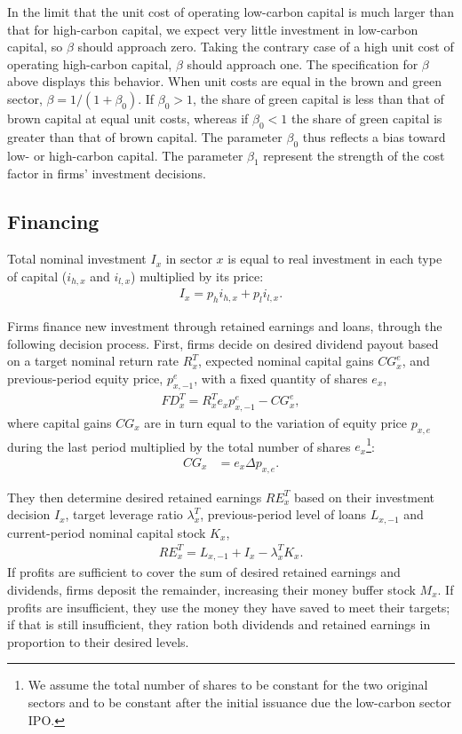 \documentclass[authoryear]{article}
\begin{document}
In the limit that the unit cost of operating low-carbon capital is much larger than that for high-carbon capital, we expect very little investment in low-carbon capital, so $\beta$ should approach zero. Taking the contrary case of a high unit cost of operating high-carbon capital, $\beta$ should approach one. The specification for $\beta$ above displays this behavior. When unit costs are equal in the brown and green sector, $\beta = 1/(1 + \beta_0)$. If $\beta_0 > 1$, the share of green capital is less than that of brown capital at equal unit costs, whereas if $\beta_0 < 1$ the share of green capital is greater than that of brown capital. The parameter $\beta_0$ thus reflects a bias toward low- or high-carbon capital. The parameter $\beta_1$ represent the strength of the cost factor in firms' investment decisions.



\subsection{Financing}
\label{sec:port}
Total nominal investment $I_x$ in sector $x$ is equal to real investment in each type of capital ($i_{h,x}$ and $i_{l,x}$) multiplied by its price:
\begin{align}
I_x = p_h i_{h,x} + p_l i_{l,x}.
\end{align}

Firms finance new investment through retained earnings and loans, through the following decision process. First, firms decide on desired dividend payout based on a target nominal return rate $R_x^T$, expected nominal capital gains $CG_x^e$, and previous-period equity price, $p_{x,-1}^e$, with a fixed quantity of shares $e_x$,
\begin{gather}
FD_x^T = R_x^T e_x p_{x,-1}^e - CG_x^e,
\end{gather}
where capital gains $CG_x$ are in turn equal to the variation of equity price $p_{x,e}$ during the last period multiplied by the total number of shares $e_x$\footnote{We assume the total number of shares to be constant for the two original sectors and to be constant after the initial issuance due the low-carbon sector IPO.}:
\begin{align}
CG_x&= e_x \Delta p_{x,e}.
\end{align} 

They then determine desired retained earnings $RE_x^T$ based on their investment decision $I_x$, target leverage ratio $\lambda_x^T$, previous-period level of loans $L_{x,-1}$ and current-period nominal capital stock $K_x$,
\begin{gather}
RE_x^T = L_{x,-1} + I_x - \lambda_x^T K_x.
\end{gather}
If profits are sufficient to cover the sum of desired retained earnings and dividends, firms deposit the remainder, increasing their money buffer stock $M_x$. If profits are insufficient, they use the money they have saved to meet their targets; if that is still insufficient, they ration both dividends and retained earnings in proportion to their desired levels.
\end{document}

